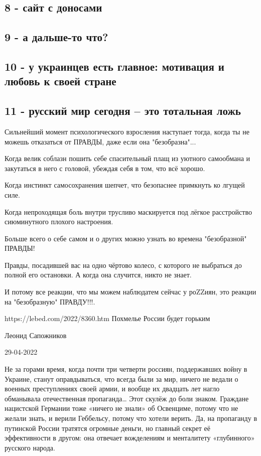 \subsection{8 - сайт с доносами}

\subsection{9 - а дальше-то что?}

\subsection{10 - у украинцев есть главное: мотивация и любовь к своей стране}

\subsection{11 - русский мир сегодня – это тотальная ложь}

Сильнейший момент психологического взросления наступает тогда, когда ты не
можешь отказаться от ПРАВДЫ, даже если она "безобразна"...

Когда велик соблазн пошить себе спасительный плащ из уютного самообмана и
закутаться в него с головой, убеждая себя в том, что всё хорошо.

Когда инстинкт самосохранения шепчет, что безопаснее примкнуть ко лгущей силе.

Когда непроходящая боль внутри трусливо маскируется под лёгкое расстройство
сиюминутного плохого настроения.

Больше всего о себе самом и о других можно узнать во времена "безобразной"
ПРАВДЫ!

Правды, посадившей вас на одно чёртово колесо, с которого не выбраться до
полной его остановки. А когда она случится, никто не знает.

И потому все реакции, что мы можем наблюдатем сейчас у роZZиян, это реакции на
"безобразную" ПРАВДУ!!!.


https://lebed.com/2022/8360.htm
Похмелье России будет горьким

Леонид Сапожников

29-04-2022

Не за горами время, когда почти три четверти
россиян,
поддержавших войну в Украине, станут оправдываться, что всегда
были за мир,
ничего не ведали о военных преступлениях своей армии, и вообще их
двадцать лет
нагло обманывала отечественная пропаганда… Этот скулёж до боли
знаком. Граждане
нацистской Германии тоже «ничего не знали» об Освенциме, потому
что не желали
знать, и верили Геббельсу, потому что хотели верить. Да, на
пропаганду в
путинской России тратятся огромные деньги, но главный секрет её
эффективности в
другом: она отвечает вожделениям и менталитету «глубинного»
русского
народа. 


